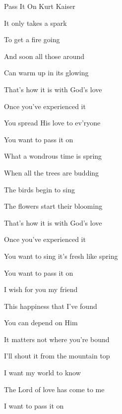 \documentclass[12pt]{book}
\begin{document}
\begin{song}{Pass It On}{}
  {}
  {Kurt Kaiser}
  {}
  {}

  \begin{SBVerse}
    It only takes a spark

    To get a fire going

    And soon all those around

    Can warm up in its glowing

    That's how it is with God's love

    Once you've experienced it

    You spread His love to ev'ryone

    You want to pass it on

  \end{SBVerse}

  \begin{SBVerse}
    What a wondrous time is spring

    When all the trees are budding

    The birds begin to sing

    The flowers start their blooming

    That's how it is with God's love

    Once you've experienced it

    You want to sing it's fresh like spring

    You want to pass it on

  \end{SBVerse}

  \begin{SBVerse}
    I wish for you my friend

    This happiness that I've found

    You can depend on Him

    It matters not where you're bound

    I'll shout it from the mountain top

    I want my world to know

    The Lord of love has come to me

    I want to pass it on
  \end{SBVerse}
\end{song}
\end{document}
